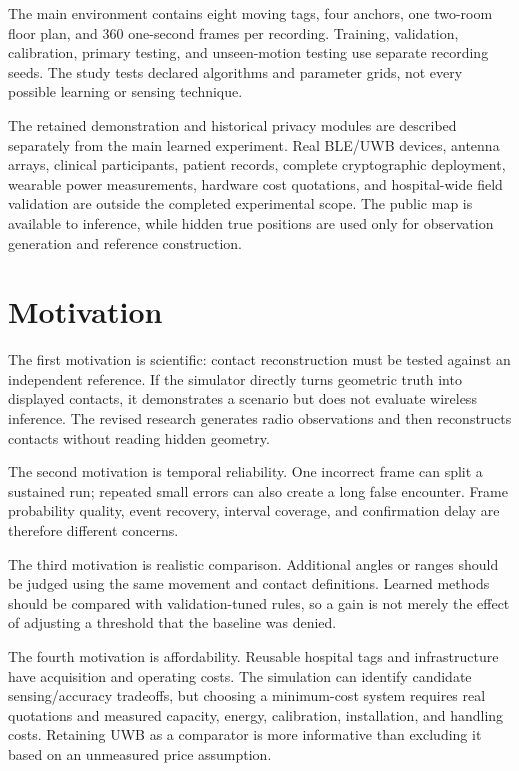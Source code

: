 \documentclass[12pt,a4paper]{report}
\begin{document}
The main environment contains eight moving tags, four anchors, one two-room floor plan, and 360 one-second frames per recording. Training, validation, calibration, primary testing, and unseen-motion testing use separate recording seeds. The study tests declared algorithms and parameter grids, not every possible learning or sensing technique.

The retained demonstration and historical privacy modules are described separately from the main learned experiment. Real BLE/UWB devices, antenna arrays, clinical participants, patient records, complete cryptographic deployment, wearable power measurements, hardware cost quotations, and hospital-wide field validation are outside the completed experimental scope. The public map is available to inference, while hidden true positions are used only for observation generation and reference construction.

\section{Motivation}
The first motivation is scientific: contact reconstruction must be tested against an independent reference. If the simulator directly turns geometric truth into displayed contacts, it demonstrates a scenario but does not evaluate wireless inference. The revised research generates radio observations and then reconstructs contacts without reading hidden geometry.

The second motivation is temporal reliability. One incorrect frame can split a sustained run; repeated small errors can also create a long false encounter. Frame probability quality, event recovery, interval coverage, and confirmation delay are therefore different concerns.

The third motivation is realistic comparison. Additional angles or ranges should be judged using the same movement and contact definitions. Learned methods should be compared with validation-tuned rules, so a gain is not merely the effect of adjusting a threshold that the baseline was denied.

The fourth motivation is affordability. Reusable hospital tags and infrastructure have acquisition and operating costs. The simulation can identify candidate sensing/accuracy tradeoffs, but choosing a minimum-cost system requires real quotations and measured capacity, energy, calibration, installation, and handling costs. Retaining UWB as a comparator is more informative than excluding it based on an unmeasured price assumption.
\end{document}
